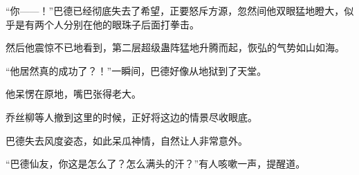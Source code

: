 \begin{this_body}
“你——！”巴德已经彻底失去了希望，正要怒斥方源，忽然间他双眼猛地瞪大，似乎是有两个人分别在他的眼珠子后面打拳击。

然后他震惊不已地看到，第二层超级蛊阵猛地升腾而起，恢弘的气势如山如海。

“他居然真的成功了？！”一瞬间，巴德好像从地狱到了天堂。

他呆愣在原地，嘴巴张得老大。

乔丝柳等人撤到这里的时候，正好将这边的情景尽收眼底。

巴德失去风度姿态，如此呆瓜神情，自然让人非常意外。

“巴德仙友，你这是怎么了？怎么满头的汗？”有人咳嗽一声，提醒道。

\end{this_body}

